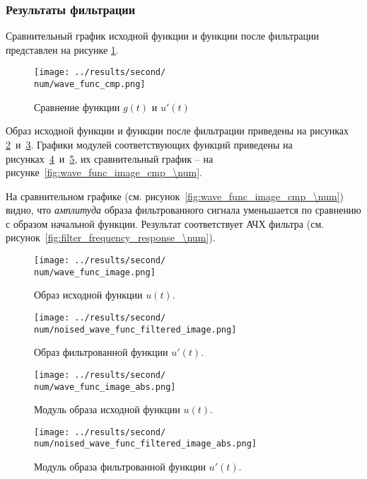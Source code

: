 \FloatBarrier
\subsubsection{Результаты фильтрации}
Сравнительный график исходной функции и функции после фильтрации представлен на рисунке \ref{fig:wave_func_cmp_\num}.

\begin{figure}[ht!]
    \centering
    \texttt{[image: ../results/second/\\num/wave\_func\_cmp.png]}
    \caption{Сравнение функции $g(t)$ и $u'(t)$}
    \label{fig:wave_func_cmp_\num}
\end{figure}

Образ исходной функции и функции после фильтрации приведены на рисунках \ref{fig:wave_func_image_\num}~и~\ref{fig:noised_wave_func_filtered_image_\num}.
Графики модулей соответствующих функций приведены на рисунках~\ref{fig:wave_func_image_abs_\num}~и~\ref{fig:noised_wave_func_filtered_image_abs_\num}, их 
сравнительный график -- на рисунке~\ref{fig:wave_func_image_cmp_\num}.

На сравнительном графике (см. рисунок~\ref{fig:wave_func_image_cmp_\num}) видно, что \textit{амплитуда} образа фильтрованного сигнала уменьшается по сравнению 
с образом начальной функции. Результат соответствует АЧХ фильтра (см. рисунок~\ref{fig:filter_frequency_response_\num}).

\begin{figure}[ht!]
    \centering
    \texttt{[image: ../results/second/\\num/wave\_func\_image.png]}
    \caption{Образ исходной функции $u(t)$.}
    \label{fig:wave_func_image_\num}
\end{figure}

\begin{figure}[ht!]
    \centering
    \texttt{[image: ../results/second/\\num/noised\_wave\_func\_filtered\_image.png]}
    \caption{Образ фильтрованной функции $u'(t)$.}
    \label{fig:noised_wave_func_filtered_image_\num}
\end{figure}

\begin{figure}[ht!]
    \centering
    \texttt{[image: ../results/second/\\num/wave\_func\_image\_abs.png]}
    \caption{Модуль образа исходной функции $u(t)$.}
    \label{fig:wave_func_image_abs_\num}
\end{figure}

\begin{figure}[ht!]
    \centering
    \texttt{[image: ../results/second/\\num/noised\_wave\_func\_filtered\_image\_abs.png]}
    \caption{Модуль образа фильтрованной функции $u'(t)$.}
    \label{fig:noised_wave_func_filtered_image_abs_\num}
\end{figure}

